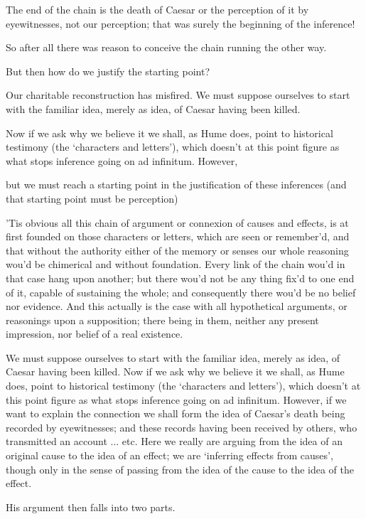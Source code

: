 The end of the chain is the death of Caesar or the perception of it by
eyewitnesses, not our perception; that was surely the beginning of the
inference!

So after all there was reason to conceive the chain running the other
way.

But then how do we justify the starting point?

Our charitable
reconstruction has misfired. We must suppose ourselves to start with the
familiar idea, merely as idea, of Caesar having been killed.

Now if we ask why
we believe it we shall, as Hume does, point to historical testimony (the
‘characters and letters’), which doesn’t at this point figure as what stops
inference going on ad infinitum. However,


but we must reach a starting point in the justification of these inferences (and
that starting point must be perception)

’Tis obvious all this chain of argument or connexion of causes and effects, is
at first founded on those characters or letters, which are seen or remember’d,
and that without the authority either of the memory or senses our whole
reasoning wou’d be chimerical and without foundation. Every link of the chain
wou’d in that case hang upon another; but there wou’d not be any thing fix’d to
one end of it, capable of sustaining the whole; and consequently there wou’d be
no belief nor evidence. And this actually is the case with all hypothetical
arguments, or reasonings upon a supposition; there being in them, neither any
present impression, nor belief of a real existence.





We must suppose ourselves to start with the familiar idea, merely as idea, of
Caesar having been killed. Now if we ask why we believe it we shall, as Hume
does, point to historical testimony (the ‘characters and letters’), which
doesn’t at this point figure as what stops inference going on ad infinitum.
However, if we want to explain the connection we shall form the idea of Caesar’s
death being recorded by eyewitnesses; and these records having been received by
others, who transmitted an account ... etc. Here we really are arguing from the
idea of an original cause to the idea of an effect; we are ‘inferring effects
from causes’, though only in the sense of passing from the idea of the cause to
the idea of the effect.

His argument then falls into two parts.

